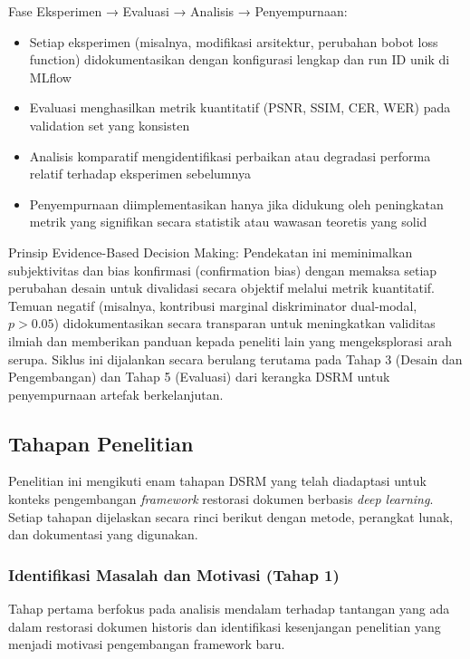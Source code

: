 \documentclass[12pt,a4paper]{article}
\begin{document}
Fase Eksperimen → Evaluasi → Analisis → Penyempurnaan:
\begin{itemize}[nosep]
    \item Setiap eksperimen (misalnya, modifikasi arsitektur, perubahan bobot loss function) didokumentasikan dengan konfigurasi lengkap dan run ID unik di MLflow
    \item Evaluasi menghasilkan metrik kuantitatif (PSNR, SSIM, CER, WER) pada validation set yang konsisten
    \item Analisis komparatif mengidentifikasi perbaikan atau degradasi performa relatif terhadap eksperimen sebelumnya
    \item Penyempurnaan diimplementasikan hanya jika didukung oleh peningkatan metrik yang signifikan secara statistik atau wawasan teoretis yang solid
\end{itemize}

Prinsip Evidence-Based Decision Making: Pendekatan ini meminimalkan subjektivitas dan bias konfirmasi (confirmation bias) dengan memaksa setiap perubahan desain untuk divalidasi secara objektif melalui metrik kuantitatif. Temuan negatif (misalnya, kontribusi marginal diskriminator dual-modal, $p>0.05$) didokumentasikan secara transparan untuk meningkatkan validitas ilmiah dan memberikan panduan kepada peneliti lain yang mengeksplorasi arah serupa. Siklus ini dijalankan secara berulang terutama pada Tahap 3 (Desain dan Pengembangan) dan Tahap 5 (Evaluasi) dari kerangka DSRM untuk penyempurnaan artefak berkelanjutan.

\subsection{Tahapan Penelitian}
\label{subsec:tahapan-penelitian}

Penelitian ini mengikuti enam tahapan DSRM yang telah diadaptasi untuk konteks pengembangan \textit{framework} restorasi dokumen berbasis \textit{deep learning}. Setiap tahapan dijelaskan secara rinci berikut dengan metode, perangkat lunak, dan dokumentasi yang digunakan.

\subsubsection{Identifikasi Masalah dan Motivasi (Tahap 1)}
Tahap pertama berfokus pada analisis mendalam terhadap tantangan yang ada dalam restorasi dokumen historis dan identifikasi kesenjangan penelitian yang menjadi motivasi pengembangan framework baru.
\end{document}
